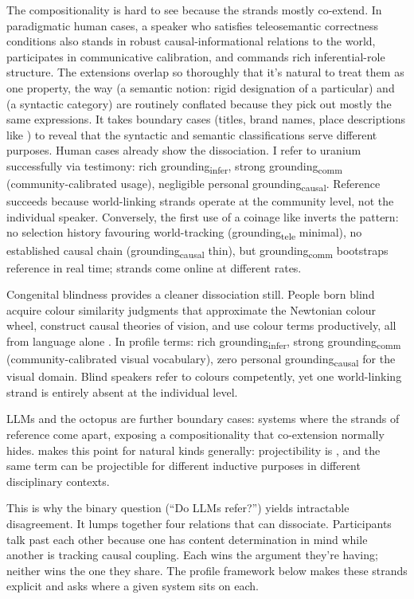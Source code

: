 \documentclass[12pt]{article}
\newcommand{\gtele}{grounding\textsubscript{tele}}
\newcommand{\gcausal}{grounding\textsubscript{causal}}
\newcommand{\gcomm}{grounding\textsubscript{comm}}
\newcommand{\ginfer}{grounding\textsubscript{infer}}
\begin{document}
The compositionality is hard to see because the strands mostly co-extend. In paradigmatic human cases, a speaker who satisfies teleosemantic correctness conditions also stands in robust causal-informational relations to the world, participates in communicative calibration, and commands rich inferential-role structure. The extensions overlap so thoroughly that it's natural to treat them as one property, the way  (a semantic notion: rigid designation of a particular) and  (a syntactic category) are routinely conflated because they pick out mostly the same expressions. It takes boundary cases (titles, brand names, place descriptions like ) to reveal that the syntactic and semantic classifications serve different purposes. Human cases already show the dissociation. I refer to uranium successfully via testimony: rich \ginfer{}, strong \gcomm{} (community-calibrated usage), negligible personal \gcausal{}. Reference succeeds because world-linking strands operate at the community level, not the individual speaker. Conversely, the first use of a coinage like  inverts the pattern: no selection history favouring world-tracking (\gtele{} minimal), no established causal chain (\gcausal{} thin), but \gcomm{} bootstraps reference in real time; strands come online at different rates.

Congenital blindness provides a cleaner dissociation still. People born blind acquire colour similarity judgments that approximate the Newtonian colour wheel, construct causal theories of vision, and use colour terms productively, all from language alone \citep{wang_bedny_2026_constructing_meaning_blind_llms}. In profile terms: rich \ginfer{}, strong \gcomm{} (community-calibrated visual vocabulary), zero personal \gcausal{} for the visual domain. Blind speakers refer to colours competently, yet one world-linking strand is entirely absent at the individual level.

LLMs and the octopus are further boundary cases: systems where the strands of reference come apart, exposing a compositionality that co-extension normally hides. \textcite[148]{boyd_1999_homeostasis} makes this point for natural kinds generally: projectibility is , and the same term can be projectible for different inductive purposes in different disciplinary contexts.

This is why the binary question (\enquote{Do LLMs refer?}) yields intractable disagreement. It lumps together four relations that can dissociate. Participants talk past each other because one has content determination in mind while another is tracking causal coupling. Each wins the argument they're having; neither wins the one they share. The profile framework below makes these strands explicit and asks where a given system sits on each.
\end{document}

